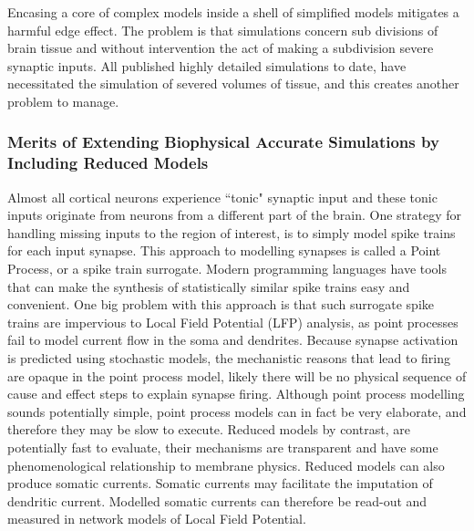 
Encasing a core of complex models inside a shell of simplified models mitigates a harmful edge effect. The problem is that simulations concern sub divisions of brain tissue and without intervention the act of making a subdivision severe synaptic inputs. All published highly detailed simulations to date, have necessitated the simulation of severed volumes of tissue, and this creates another problem to manage.\\
\subsubsection{Merits of Extending Biophysical Accurate Simulations by Including Reduced Models}
Almost all cortical neurons experience ``tonic" synaptic input and these tonic inputs originate from neurons from a different part of the brain. One strategy for handling missing inputs to the region of interest, is to simply model spike trains for each input synapse. This approach to modelling synapses is called a Point Process, or a spike train surrogate. Modern programming languages have tools that can make the synthesis of statistically similar spike trains easy and convenient. One big problem with this approach is that such surrogate spike trains are impervious to Local Field Potential (LFP) analysis, as point processes fail to model current flow in the soma and dendrites. Because synapse activation is predicted using stochastic models, the mechanistic reasons that lead to firing are opaque in the point process model, likely there will be no physical sequence of cause and effect steps to explain synapse firing. Although point process modelling sounds potentially simple, point process models can in fact be very elaborate, and therefore they may be slow to execute. Reduced models by contrast, are potentially fast to evaluate, their mechanisms are transparent and have some phenomenological relationship to membrane physics. Reduced models can also produce somatic currents. Somatic currents may facilitate the imputation of dendritic current. Modelled somatic currents can therefore be read-out and measured in network models of Local Field Potential.

